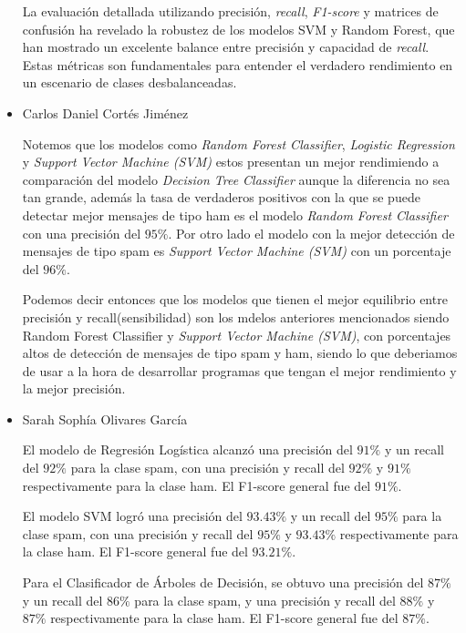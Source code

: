 \begin{itemize}
    La evaluación detallada utilizando precisión, \textit{recall}, \textit{F1-score} y matrices de confusión ha revelado la robustez de los modelos SVM y 
    Random Forest, que han mostrado un excelente balance entre precisión y capacidad de \textit{recall}. Estas métricas son fundamentales para 
    entender el verdadero rendimiento en un escenario de clases desbalanceadas.

    \item Carlos Daniel Cortés Jiménez

    Notemos que los modelos como \textit{Random Forest Classifier}, \textit{Logistic Regression} y \textit{Support Vector Machine (SVM)} estos 
    presentan un mejor rendimiendo a comparación del modelo \textit{Decision Tree Classifier} aunque la diferencia no sea tan grande, además 
    la tasa de verdaderos positivos con la que se puede detectar mejor mensajes de tipo ham es el modelo \textit{Random Forest Classifier} con 
    una precisión del $95\%$. Por otro lado el modelo con la mejor detección de mensajes de tipo spam es \textit{Support Vector Machine (SVM)} 
    con un porcentaje del $96\%$.

    Podemos decir entonces que los modelos que tienen el mejor equilibrio entre precisión y recall(sensibilidad) son los mdelos anteriores 
    mencionados siendo Random Forest Classifier y \textit{Support Vector Machine (SVM)}, con porcentajes altos de detección de mensajes 
    de tipo spam y ham, siendo lo que deberiamos de usar a la hora de desarrollar programas que tengan el mejor rendimiento y la mejor precisión.

    \item Sarah Sophía Olivares García

    El modelo de Regresión Logística alcanzó una precisión del $91\%$ y un recall del $92\%$ para la clase spam, con una precisión y         recall del $92\%$ y $91\%$ respectivamente para la clase ham. El F1-score general fue del $91\%$.

    El modelo SVM logró una precisión del $93.43\%$ y un recall del $95\%$ para la clase spam, con una precisión y recall del $95\%$ y         $93.43\%$ respectivamente para la clase ham. El F1-score general fue del $93.21\%$.

    Para el Clasificador de Árboles de Decisión, se obtuvo una precisión del $87\%$ y un recall del $86\%$ para la clase spam, y una         precisión y recall del $88\%$ y $87\%$ respectivamente para la clase ham. El F1-score general fue del $87\%$.


\end{itemize}
